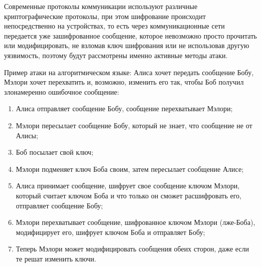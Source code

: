 	Современные протоколы коммуникации используют различные криптографические протоколы, при этом шифрование происходит непосредственно на устройствах, то есть через коммуникационные сети передается уже зашифрованное сообщение, которое невозможно просто прочитать или модифицировать, не взломав ключ шифрования или не использовав другую уязвимость, поэтому будут рассмотрены именно активные методы атаки. 
	
	Пример атаки на алгоритмическом языке: Алиса хочет передать сообщение Бобу, Мэлори хочет перехватить и, возможно, изменить его так, чтобы Боб получил  злонамеренно ошибочное сообщение:
	\begin{enumerate}
		\item Алиса отправляет сообщение Бобу,  сообщение перехватывает Мэлори;
		\item Мэлори пересылает сообщение Бобу, который не знает, что сообщение не от Алисы;
		\item Боб посылает свой ключ;
		\item Мэлори подменяет ключ Боба своим, затем  пересылает сообщение Алисе;
		\item Алиса принимает сообщение, шифрует свое сообщение ключом Мэлори, который считает ключом Боба и  что только он сможет расшифровать его, отправляет сообщение Бобу;
		\item Мэлори перехватывает сообщение, шифрованное ключом Мэлори (лже-Боба), модифицирует его, шифрует ключом Боба и отправляет Бобу;
		\item Теперь Мэлори может модифицировать сообщения  обеих сторон, даже если те решат изменить ключи.
	\end{enumerate}
	
\newpage